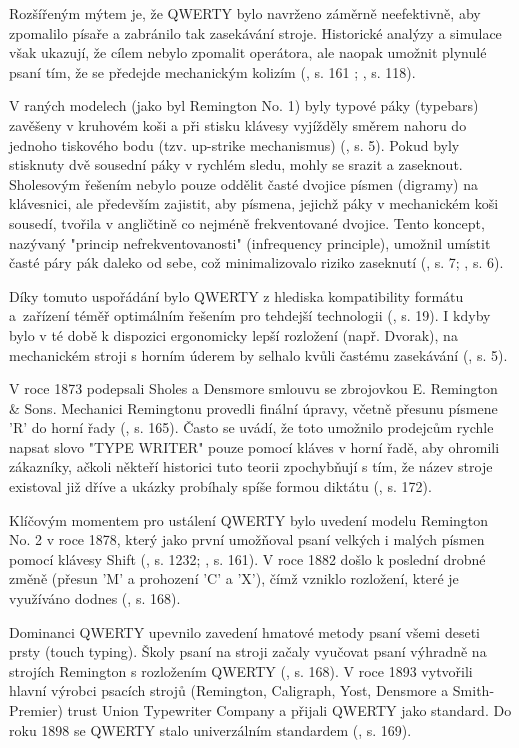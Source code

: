 \documentclass[a4paper, twoside, 12pt, czech]{article}
\begin{document}
Rozšířeným mýtem je, že QWERTY bylo navrženo záměrně neefektivně, aby zpomalilo 
písaře a zabránilo tak zasekávání stroje. Historické analýzy a simulace však 
ukazují, že cílem nebylo zpomalit operátora, ale naopak umožnit plynulé psaní 
tím, že se předejde mechanickým kolizím (\cite{prehistory}, s. 161 ; \cite{qwerty-immortal}, s. 118).

V raných modelech (jako byl Remington No. 1) byly typové páky (typebars) 
zavěšeny v kruhovém koši a při stisku klávesy vyjížděly směrem nahoru do jednoho 
tiskového bodu (tzv. up-strike mechanismus) (\cite{lockin}, s. 5). Pokud byly stisknuty dvě sousední 
páky v rychlém sledu, mohly se srazit a zaseknout. Sholesovým řešením nebylo 
pouze oddělit časté dvojice písmen (digramy) na klávesnici, ale především 
zajistit, aby písmena, jejichž páky v mechanickém koši sousedí, tvořila v 
angličtině co nejméně frekventované dvojice. Tento koncept, nazývaný "princip 
nefrekventovanosti" (infrequency principle), umožnil umístit časté páry pák 
daleko od sebe, což minimalizovalo riziko zaseknutí (\cite{lockin}, s. 7; \cite{hidden-in-plain-sight}, s. 6).

Díky tomuto uspořádání bylo QWERTY z hlediska kompatibility formátu a~zařízení 
téměř optimálním řešením pro tehdejší technologii
(\cite{lockin}, s. 19). 
I kdyby bylo v té době k dispozici ergonomicky lepší rozlože\-ní (např. Dvorak), 
na mechanickém stroji s horním úderem by selhalo kvůli časté\-mu zasekávání
(\cite{qwertyoptimality}, s. 5).

V roce 1873 podepsali Sholes a Densmore smlouvu se zbrojovkou E. Remington \& 
Sons. Mechanici Remingtonu provedli finální úpravy, včetně přesunu písmene 'R' 
do horní řady (\cite{prehistory}, s. 165). Často se uvádí, že toto umožnilo prodejcům rychle napsat slovo 
"TYPE WRITER" pouze pomocí kláves v horní řadě, aby ohromili zákazníky, ačkoli 
někteří historici tuto teorii zpochybňují s tím, že název stroje existoval již 
dříve a ukázky probíhaly spíše formou diktátu (\cite{prehistory}, s. 172).

Klíčovým momentem pro ustálení QWERTY bylo uvedení modelu Remington No. 2 v roce 
1878, který jako první umožňoval psaní velkých i malých písmen pomocí klávesy 
Shift (\cite{qwerty-dilemma}, s. 1232; \cite{prehistory}, s. 161). V roce 1882 došlo k 
poslední drobné změně (přesun 'M' a prohození 'C' a 'X'), čímž vzniklo rozložení, 
které je využí\-váno dodnes (\cite{prehistory}, s. 168).

Dominanci QWERTY upevnilo zavedení hmatové metody psaní všemi deseti prsty 
(touch typing). Školy psaní na stroji začaly vyučovat psaní výhradně na strojích Remington s 
rozložením QWERTY (\cite{prehistory}, s. 168). V roce 1893 vytvořili hlavní výrobci psacích strojů 
(Remington, Caligraph, Yost, Densmore a Smith-Premier) trust Union Typewriter 
Company a přijali QWERTY jako standard. Do roku 1898 se QWERTY stalo 
univerzálním standardem (\cite{prehistory}, s. 169).
\end{document}
